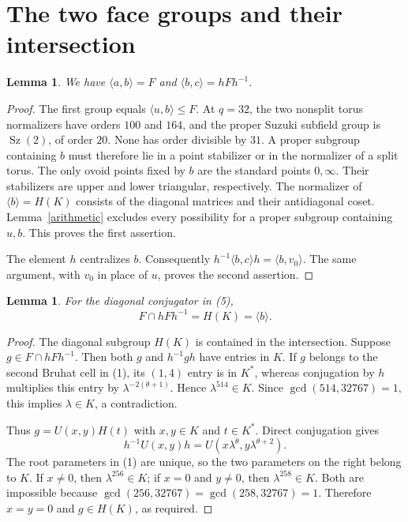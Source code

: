 \documentclass[11pt,a4paper]{article}
\newtheorem{lemma}[theorem]{Lemma}
\newcommand{\Sz}{\operatorname{Sz}}
\newcommand{\gen}[1]{\langle#1\rangle}
\begin{document}
\section{The two face groups and their intersection}
\begin{lemma}\label{faces}
We have $\gen{a,b}=F$ and $\gen{b,c}=hFh^{-1}$.
\end{lemma}
\begin{proof}
The first group equals $\gen{u,b}\leq F$. At $q=32$, the two
nonsplit torus normalizers have orders $100$ and $164$, and the
proper Suzuki subfield group is $\Sz(2)$, of order $20$. None has
order divisible by $31$. A proper subgroup containing $b$ must
therefore lie in a point stabilizer or in the normalizer of a split
torus. The only ovoid points fixed by $b$ are the standard points
$0,\infty$. Their stabilizers are upper and lower triangular,
respectively. The normalizer of $\gen b=H(K)$ consists of the
diagonal matrices and their antidiagonal coset. Lemma~\ref{arithmetic}
excludes every possibility for a proper subgroup containing $u,b$.
This proves the first assertion.

The element $h$ centralizes $b$. Consequently
$h^{-1}\gen{b,c}h=\gen{b,v_0}$. The same argument, with $v_0$ in
place of $u$, proves the second assertion.
\end{proof}

\begin{lemma}\label{intersection}
For the diagonal conjugator in (5),
\[
 F\cap hFh^{-1}=H(K)=\gen b.
 \tag{8}
\]
\end{lemma}
\begin{proof}
The diagonal subgroup $H(K)$ is contained in the intersection.
Suppose $g\in F\cap hFh^{-1}$. Then both $g$ and $h^{-1}gh$
have entries in $K$. If $g$ belongs to the second Bruhat cell in
(1), its $(1,4)$ entry is in $K^*$, whereas conjugation by $h$
multiplies this entry by $\lambda^{-2(\theta+1)}$. Hence
$\lambda^{514}\in K$. Since $\gcd(514,32767)=1$, this implies
$\lambda\in K$, a contradiction.

Thus $g=U(x,y)H(t)$ with $x,y\in K$ and $t\in K^*$. Direct
conjugation gives
\[
 h^{-1}U(x,y)h
   =U(x\lambda^\theta,y\lambda^{\theta+2}).
 \tag{9}
\]
The root parameters in (1) are unique, so the two parameters on the
right belong to $K$. If $x\ne0$, then $\lambda^{256}\in K$;
if $x=0$ and $y\ne0$, then $\lambda^{258}\in K$.
Both are impossible because
$\gcd(256,32767)=\gcd(258,32767)=1$. Therefore $x=y=0$ and
$g\in H(K)$, as required.
\end{proof}
\end{document}
